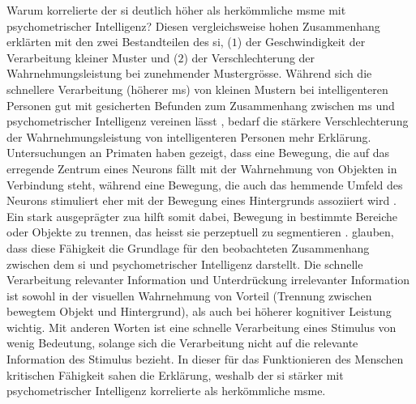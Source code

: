 \documentclass[11pt, twoside, a4paper]{book}		%
\begin{document}
Warum korrelierte der \gls{si} deutlich höher \citep[$r~=~.64$ und $r~=~.71$;][]{Melnick2013} als herkömmliche \gls{msm}e \citep[$r~=~-.24$;][]{Sheppard2008} mit psychometrischer Intelligenz? Diesen vergleichsweise hohen Zusammenhang erklärten \citet{Melnick2013} mit den zwei Bestandteilen des \gls{si}, ($1$) der Geschwindigkeit der Verarbeitung kleiner Muster und ($2$) der Verschlechterung der Wahrnehmungsleistung bei zunehmender Mustergrösse. Während sich die schnellere Verarbeitung (höherer \gls{ms}) von kleinen Mustern bei intelligenteren Personen gut mit gesicherten Befunden zum Zusammenhang zwischen \gls{ms} und psychometrischer Intelligenz vereinen lässt \citep[][]{Sheppard2008}, bedarf die stärkere Verschlechterung der Wahrnehmungsleistung von intelligenteren Personen mehr Erklärung. Untersuchungen an Primaten haben gezeigt, dass eine Bewegung, die auf das erregende Zentrum eines Neurons fällt mit der Wahrnehmung von Objekten in Verbindung steht, während eine Bewegung, die auch das hemmende Umfeld des Neurons stimuliert eher mit der Bewegung eines Hintergrunds assoziiert wird \citep{Born2000, Churan2008, Regan2000}. Ein stark ausgeprägter \gls{zua} hilft somit dabei, Bewegung in bestimmte Bereiche oder Objekte zu trennen, das heisst sie perzeptuell zu segmentieren \citep{Braddick1993}. \citeauthor{Melnick2013} glauben, dass diese Fähigkeit die Grundlage für den beobachteten Zusammenhang zwischen dem \gls{si} und psychometrischer Intelligenz darstellt. Die schnelle Verarbeitung relevanter Information und Unterdrückung irrelevanter Information ist sowohl in der visuellen Wahrnehmung von Vorteil (Trennung zwischen bewegtem Objekt und Hintergrund), als auch bei höherer kognitiver Leistung \citep[Aufmerksamkeitslenkung auf relevante Information und Unterdrückung von Interferenzen; siehe][]{Burgess2011, Engle1999, Zanto2009} wichtig. Mit anderen Worten ist eine schnelle Verarbeitung eines Stimulus von wenig Bedeutung, solange sich die Verarbeitung nicht auf die relevante Information des Stimulus bezieht. In dieser für das Funktionieren des Menschen kritischen Fähigkeit sahen \citeauthor{Melnick2013} die Erklärung, weshalb der \gls{si} stärker mit psychometrischer Intelligenz korrelierte als herkömmliche \gls{msm}e. 
\end{document}

